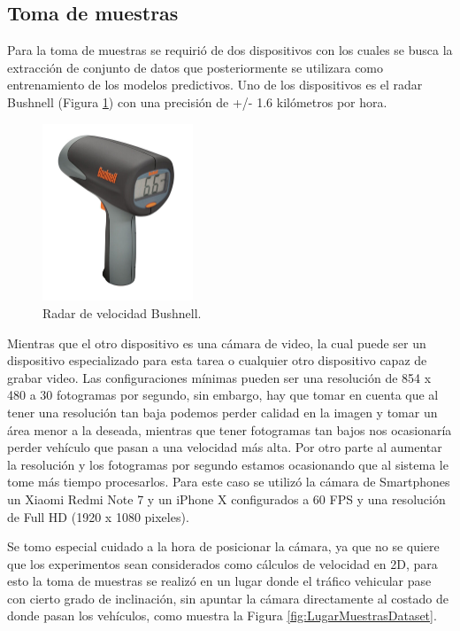 \subsection{Toma de muestras}

Para la toma de muestras se requirió de dos dispositivos con los cuales se busca la extracción de conjunto de datos que posteriormente se utilizara como entrenamiento de los modelos predictivos. Uno de los dispositivos es el radar Bushnell (Figura \ref{fig:RadarVelocidad}) con una precisión de +/- 1.6 kilómetros por hora.

\begin{figure}[H]
    \centering
    \includegraphics[width=0.4\textwidth]{Metodologia/imgs/bushnell.jpg}
    \caption{Radar de velocidad Bushnell.}
    \label{fig:RadarVelocidad}
\end{figure}

Mientras que el otro dispositivo es una cámara de video, la cual puede ser un dispositivo especializado para esta tarea o cualquier otro dispositivo capaz de grabar video. Las configuraciones mínimas pueden ser una resolución de 854 x 480 a 30 fotogramas por segundo, sin embargo, hay que tomar en cuenta que al tener una resolución tan baja podemos perder calidad en la imagen y tomar un área menor a la deseada, mientras que tener fotogramas tan bajos nos ocasionaría perder vehículo que pasan a una velocidad más alta. Por otro parte al aumentar la resolución y los fotogramas por segundo estamos ocasionando que al sistema le tome más tiempo procesarlos. Para este caso se utilizó la cámara de Smartphones un Xiaomi Redmi Note 7 y un iPhone X configurados a 60 FPS y una resolución de Full HD (1920 x 1080 pixeles).

Se tomo especial cuidado a la hora de posicionar la cámara, ya que no se quiere que los experimentos sean considerados como cálculos de velocidad en 2D, para esto la toma de muestras se realizó en un lugar donde el tráfico vehicular pase con cierto grado de inclinación, sin apuntar la cámara directamente al costado de donde pasan los vehículos, como muestra la Figura \ref{fig:LugarMuestrasDataset}.

